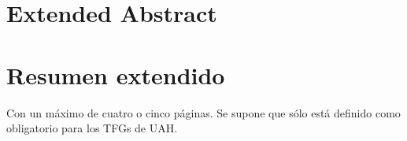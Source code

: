 %

{
\chapter*{Extended Abstract}
\label{cha:resumen-extendido}

}
{
\chapter*{Resumen extendido}
\label{cha:resumen-extendido}

}

Con un máximo de cuatro o cinco páginas. Se supone que sólo está definido como obligatorio para los TFGs de UAH.



